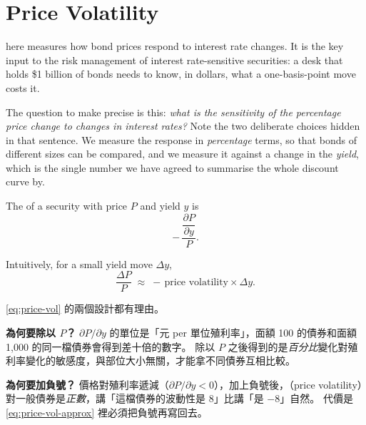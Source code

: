 \section{Price Volatility}


 here measures how bond prices respond to interest rate changes.
It is the key input to the risk management of interest rate-sensitive securities: a desk that holds \$1 billion of bonds needs to know, in dollars, what a one-basis-point move costs it.

The question to make precise is this: \emph{what is the sensitivity of the percentage price change to changes in interest rates?}
\suppstart
Note the two deliberate choices hidden in that sentence.
We measure the response in \emph{percentage} terms, so that bonds of different sizes can be compared, and we measure it against a change in the \emph{yield}, which is the single number we have agreed to summarise the whole discount curve by.
\suppend

\begin{definition}
	The  of a security with price $P$ and yield $y$ is
	\begin{equation}
		-\,\frac{\dfrac{\partial P}{\partial y}}{P}. \label{eq:price-vol}
	\end{equation}
\end{definition}

Intuitively, for a small yield move $\Delta y$,
\begin{equation}
	\frac{\Delta P}{P} \;\approx\; -\,\text{price volatility} \times \Delta y. \label{eq:price-vol-approx}
\end{equation}

\suppstart
\begin{remark}
	\eqref{eq:price-vol} 的兩個設計都有理由。

	\textbf{為何要除以 $P$？}
	$\partial P/\partial y$ 的單位是「元 per 單位殖利率」，面額 100 的債券和面額 1{,}000 的同一檔債券會得到差十倍的數字。
	除以 $P$ 之後得到的是\emph{百分比}變化對殖利率變化的敏感度，與部位大小無關，才能拿不同債券互相比較。

	\textbf{為何要加負號？}
	價格對殖利率遞減（$\partial P/\partial y < 0$），加上負號後，（price volatility）對一般債券是\emph{正數}，講「這檔債券的波動性是 8」比講「是 $-8$」自然。
	代價是 \eqref{eq:price-vol-approx} 裡必須把負號再寫回去。
\end{remark}

